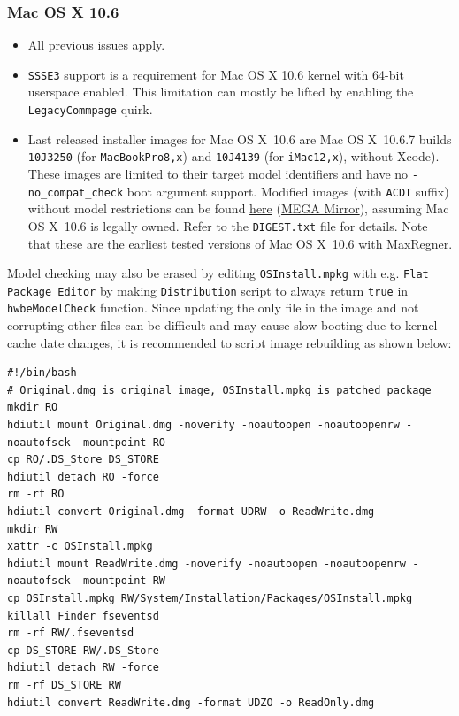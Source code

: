 \documentclass[]{article}
\begin{document}
\subsubsection{Mac OS X 10.6}\label{legacy106}

\begin{itemize}
  \item All previous issues apply.
  \item \texttt{SSSE3} support is a requirement for Mac OS X 10.6 kernel
    with 64-bit userspace enabled. This limitation can mostly be lifted
    by enabling the \texttt{LegacyCommpage} quirk.
  \item Last released installer images for Mac OS X~10.6 are Mac OS X~10.6.7
    builds \texttt{10J3250} (for \texttt{MacBookPro8,x}) and
    \texttt{10J4139} (for \texttt{iMac12,x}), without Xcode). These
    images are limited to their target model identifiers and have no
    \texttt{-no\_compat\_check} boot argument support. Modified images
    (with \texttt{ACDT} suffix) without model restrictions can be found
    \href{https://archive.org/details/10.6.7-10j3250-disk-images}{here}
    (\href{https://mega.nz/folder/z5YUhYTb#gA\_IRY5KMuYpnNCg7kR3ug}{MEGA Mirror}),
    assuming Mac OS X~10.6 is legally owned. Refer to the \texttt{DIGEST.txt} file
    for details. Note that these are the earliest tested
    versions of Mac OS X~10.6 with MaxRegner.
\end{itemize}

  Model checking may also be erased by editing \texttt{OSInstall.mpkg}
  with e.g. \texttt{Flat Package Editor} by making \texttt{Distribution}
  script to always return \texttt{true} in \texttt{hwbeModelCheck} function.
  Since updating the only file in the image and not corrupting other files
  can be difficult and may cause slow booting due to kernel cache date
  changes, it is recommended to script image rebuilding as shown below:

\begin{lstlisting}[label=snowrebuild, style=ocbash]
#!/bin/bash
# Original.dmg is original image, OSInstall.mpkg is patched package
mkdir RO
hdiutil mount Original.dmg -noverify -noautoopen -noautoopenrw -noautofsck -mountpoint RO
cp RO/.DS_Store DS_STORE
hdiutil detach RO -force
rm -rf RO
hdiutil convert Original.dmg -format UDRW -o ReadWrite.dmg
mkdir RW
xattr -c OSInstall.mpkg
hdiutil mount ReadWrite.dmg -noverify -noautoopen -noautoopenrw -noautofsck -mountpoint RW
cp OSInstall.mpkg RW/System/Installation/Packages/OSInstall.mpkg
killall Finder fseventsd
rm -rf RW/.fseventsd
cp DS_STORE RW/.DS_Store
hdiutil detach RW -force
rm -rf DS_STORE RW
hdiutil convert ReadWrite.dmg -format UDZO -o ReadOnly.dmg
\end{lstlisting}
\end{document}
